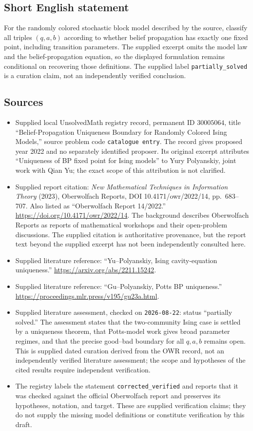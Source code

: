 \documentclass[11pt]{article}
\begin{document}
\subsection{Short English statement}
For the randomly colored stochastic block model described by the source, classify all triples \((q,a,b)\) according to whether belief propagation has exactly one fixed point, including transition parameters. The supplied excerpt omits the model law and the belief-propagation equation, so the displayed formulation remains conditional on recovering those definitions. The supplied label \texttt{partially\_solved} is a curation claim, not an independently verified conclusion.
\subsection{Sources}
\begin{itemize}
\item Supplied local UnsolvedMath registry record, permanent ID \(30005064\), title ``Belief-Propagation Uniqueness Boundary for Randomly Colored Ising Models,'' source problem code \texttt{catalogue entry}. The record gives proposed year 2022 and no separately identified proposer. Its original excerpt attributes ``Uniqueness of BP fixed point for Ising models'' to Yury Polyanskiy, joint work with Qian Yu; the exact scope of this attribution is not clarified.
\item Supplied report citation: \emph{New Mathematical Techniques in Information Theory} (2023), Oberwolfach Reports, DOI 10.4171/owr/2022/14, pp.~683--707. Also listed as ``Oberwolfach Report 14/2022.'' \url{https://doi.org/10.4171/owr/2022/14}. The background describes Oberwolfach Reports as reports of mathematical workshops and their open-problem discussions. The supplied citation is authoritative provenance, but the report text beyond the supplied excerpt has not been independently consulted here.
\item Supplied literature reference: ``Yu--Polyanskiy, Ising cavity-equation uniqueness.'' \url{https://arxiv.org/abs/2211.15242}.
\item Supplied literature reference: ``Gu--Polyanskiy, Potts BP uniqueness.'' \url{https://proceedings.mlr.press/v195/gu23a.html}.
\item Supplied literature assessment, checked on \texttt{2026-08-22}: status ``partially solved.'' The assessment states that the two-community Ising case is settled by a uniqueness theorem, that Potts-model work gives broad parameter regimes, and that the precise good--bad boundary for all \(q,a,b\) remains open. This is supplied dated curation derived from the OWR record, not an independently verified literature assessment; the scope and hypotheses of the cited results require independent verification.
\item The registry labels the statement \texttt{corrected\_verified} and reports that it was checked against the official Oberwolfach report and preserves its hypotheses, notation, and target. These are supplied verification claims; they do not supply the missing model definitions or constitute verification by this draft.
\end{itemize}
\end{document}
